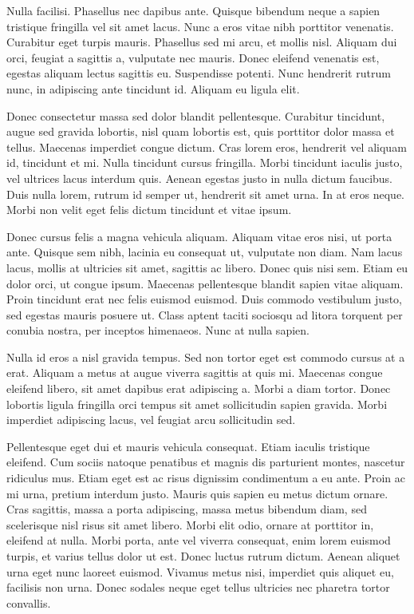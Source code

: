 \documentclass[a4paper]{article}
\begin{document}
Nulla facilisi. Phasellus nec dapibus ante. Quisque bibendum neque a sapien tristique fringilla vel sit amet lacus. Nunc a eros vitae nibh porttitor venenatis. Curabitur eget turpis mauris. Phasellus sed mi arcu, et mollis nisl. Aliquam dui orci, feugiat a sagittis a, vulputate nec mauris. Donec eleifend venenatis est, egestas aliquam lectus sagittis eu. Suspendisse potenti. Nunc hendrerit rutrum nunc, in adipiscing ante tincidunt id. Aliquam eu ligula elit.

Donec consectetur massa sed dolor blandit pellentesque. Curabitur tincidunt, augue sed gravida lobortis, nisl quam lobortis est, quis porttitor dolor massa et tellus. Maecenas imperdiet congue dictum. Cras lorem eros, hendrerit vel aliquam id, tincidunt et mi. Nulla tincidunt cursus fringilla. Morbi tincidunt iaculis justo, vel ultrices lacus interdum quis. Aenean egestas justo in nulla dictum faucibus. Duis nulla lorem, rutrum id semper ut, hendrerit sit amet urna. In at eros neque. Morbi non velit eget felis dictum tincidunt et vitae ipsum.

Donec cursus felis a magna vehicula aliquam. Aliquam vitae eros nisi, ut porta ante. Quisque sem nibh, lacinia eu consequat ut, vulputate non diam. Nam lacus lacus, mollis at ultricies sit amet, sagittis ac libero. Donec quis nisi sem. Etiam eu dolor orci, ut congue ipsum. Maecenas pellentesque blandit sapien vitae aliquam. Proin tincidunt erat nec felis euismod euismod. Duis commodo vestibulum justo, sed egestas mauris posuere ut. Class aptent taciti sociosqu ad litora torquent per conubia nostra, per inceptos himenaeos. Nunc at nulla sapien.

Nulla id eros a nisl gravida tempus. Sed non tortor eget est commodo cursus at a erat. Aliquam a metus at augue viverra sagittis at quis mi. Maecenas congue eleifend libero, sit amet dapibus erat adipiscing a. Morbi a diam tortor. Donec lobortis ligula fringilla orci tempus sit amet sollicitudin sapien gravida. Morbi imperdiet adipiscing lacus, vel feugiat arcu sollicitudin sed.

Pellentesque eget dui et mauris vehicula consequat. Etiam iaculis tristique eleifend. Cum sociis natoque penatibus et magnis dis parturient montes, nascetur ridiculus mus. Etiam eget est ac risus dignissim condimentum a eu ante. Proin ac mi urna, pretium interdum justo. Mauris quis sapien eu metus dictum ornare. Cras sagittis, massa a porta adipiscing, massa metus bibendum diam, sed scelerisque nisl risus sit amet libero. Morbi elit odio, ornare at porttitor in, eleifend at nulla. Morbi porta, ante vel viverra consequat, enim lorem euismod turpis, et varius tellus dolor ut est. Donec luctus rutrum dictum. Aenean aliquet urna eget nunc laoreet euismod. Vivamus metus nisi, imperdiet quis aliquet eu, facilisis non urna. Donec sodales neque eget tellus ultricies nec pharetra tortor convallis.
\end{document}
